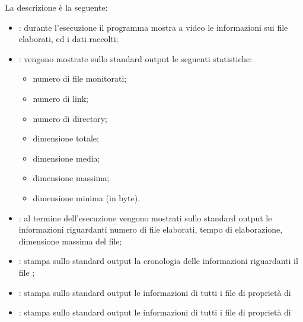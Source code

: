 \documentclass[letterpaper,10pt,italian,openany,oneside]{sphinxmanual}
\begin{document}
La descrizione è la seguente:
\begin{itemize}
\item {} 
: durante l’esecuzione il programma mostra a video le informazioni sui file elaborati, ed i dati raccolti;

\item {} 
: vengono mostrate sullo standard output le seguenti statistiche:
\begin{itemize}
\item {} 
numero di file monitorati;

\item {} 
numero di link;

\item {} 
numero di directory;

\item {} 
dimensione totale;

\item {} 
dimensione media;

\item {} 
dimensione massima;

\item {} 
dimensione minima (in byte).

\end{itemize}

\item {} 
: al termine dell’esecuzione vengono mostrati sullo standard output le informazioni riguardanti numero di file elaborati, tempo di elaborazione, dimensione massima del file;

\item {} 
: stampa sullo standard output la cronologia delle informazioni riguardanti il file ;

\item {} 
: stampa sullo standard output le informazioni di tutti i file di proprietà di 

\item {} 
: stampa sullo standard output le informazioni di tutti i file di proprietà di 


\end{itemize}
\end{document}
